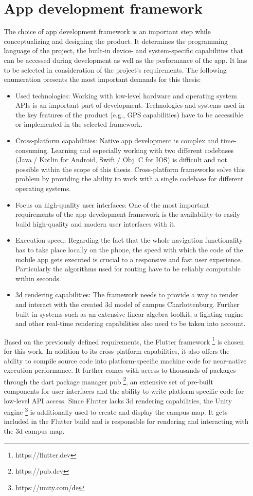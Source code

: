 \section{App development framework}
The choice of app development framework is an important step while conceptualizing and designing the product. It determines the programming language of the project, the built-in device- and system-specific capabilities that can be accessed during development as well as the performance of the app. It has to be selected in consideration of the project's requirements. The following enumeration presents the most important demands for this thesis:
\begin{itemize}
    \item Used technologies: Working with low-level hardware and operating system APIs is an important part of development. Technologies and systems used in the key features of the product (e.g., GPS capabilities) have to be accessible or implemented in the selected framework.
    \item Cross-platform capabilities: Native app development is complex and time-consuming. Learning and especially working with two different codebases (Java / Kotlin for Android, Swift / Obj. C for IOS) is difficult and not possible within the scope of this thesis. Cross-platform frameworks solve this problem by providing the ability to work with a single codebase for different operating systems.
    \item Focus on high-quality user interfaces: One of the most important requirements of the app development framework is the availability to easily build high-quality and modern user interfaces with it. 
    \item Execution speed: Regarding the fact that the whole navigation functionality has to take place locally on the phone, the speed with which the code of the mobile app gets executed is crucial to a responsive and fast user experience. Particularly the algorithms used for routing have to be reliably computable within seconds.
    \item 3d rendering capabilities: The framework needs to provide a way to render and interact with the created 3d model of campus Charlottenburg. Further built-in systems such as an extensive linear algebra toolkit, a lighting engine and other real-time rendering capabilities also need to be taken into account.
\end{itemize}

Based on the previously defined requirements, the Flutter framework \footnote{https://flutter.dev} is chosen for this work. In addition to its cross-platform capabilities, it also offers the ability to compile source code into platform-specific machine code for near-native execution performance. It further comes with access to thousands of packages through the dart package manager pub \footnote{https://pub.dev}, an extensive set of pre-built components for user interfaces and the ability to write platform-specific code for low-level API access. Since Flutter lacks 3d rendering capabilities, the Unity engine \footnote{https://unity.com/de} is additionally used to create and display the campus map. It gets included in the Flutter build and is responsible for rendering and interacting with the 3d campus map.

